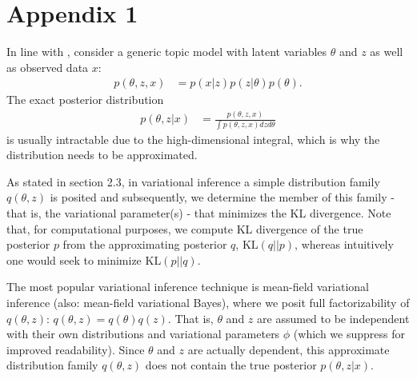 \section{Appendix 1}

In line with \cite{wang2013variational}, consider a generic topic model with latent variables $\theta$ and $z$ as well as observed data $x$:
\begin{align*}
p(\theta,z,x) &= p(x|z)p(z|\theta)p(\theta).
\end{align*}
The exact posterior distribution
\begin{align*}
p(\theta,z|x) &= \frac{p(\theta,z,x)}{\int p(\theta,z,x)dzd\theta}
\end{align*}
is usually intractable due to the high-dimensional integral, which is why the distribution needs to be approximated.

As stated in section 2.3, in variational inference a simple distribution family $q(\theta,z)$ is posited and subsequently, we determine the member of this family - that is, the variational parameter(s) - that minimizes the KL divergence. Note that, for computational purposes, we compute KL divergence of the true posterior $p$ from the approximating posterior $q$, $\text{KL}(q||p)$, whereas intuitively one would seek to minimize $\text{KL}(p||q)$.

The most popular variational inference technique is mean-field variational inference (also: mean-field variational Bayes), where we posit full factorizability of $q(\theta,z)$: $q(\theta,z) = q(\theta)q(z)$. That is, $\theta$ and $z$ are assumed to be independent with their own distributions and variational parameters $\phi$ (which we suppress for improved readability). Since $\theta$ and $z$ are actually dependent, this approximate distribution family $q(\theta,z)$ does not contain the true posterior $p(\theta,z|x)$.  

